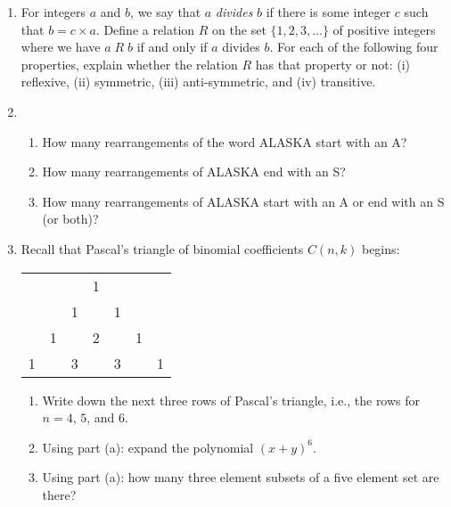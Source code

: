 \documentclass[11pt]{article}
\begin{document}
\begin{enumerate}
\item For integers $a$ and $b$, we say that $a$ \emph{divides} $b$ if there is some integer $c$ such that $b = c \times a$. Define a relation $R$ on the set $\{1,2,3,\ldots\}$ of positive integers where we have $a \; R \; b$ if and only if $a$ divides $b$. For each of the following four properties, explain whether the relation $R$ has that property or not: (i) reflexive, (ii) symmetric, (iii) anti-symmetric, and (iv) transitive.

\item \begin{enumerate}
\item How many rearrangements of the word ALASKA start with an A?
\item How many rearrangements of ALASKA end with an S?
\item How many rearrangements of ALASKA start with an A or end with an S (or both)?
\end{enumerate}

\item Recall that Pascal's triangle of binomial coefficients $C(n,k)$ begins:
\begin{center}
\begin{tabular}{c c c c c c c}
 & & & 1 & & & \\
 & & 1 & & 1 & & \\
 & 1 && 2 && 1 & \\
 1 && 3 && 3 && 1
\end{tabular}
\end{center}
\begin{enumerate}
\item Write down the next three rows of Pascal's triangle, i.e., the rows for $n=4$, $5$, and $6$.
\item Using part (a): expand the polynomial $(x+y)^6$.
\item Using part (a): how many three element subsets of a five element set are there?
\end{enumerate}

\end{enumerate}
\end{document}
